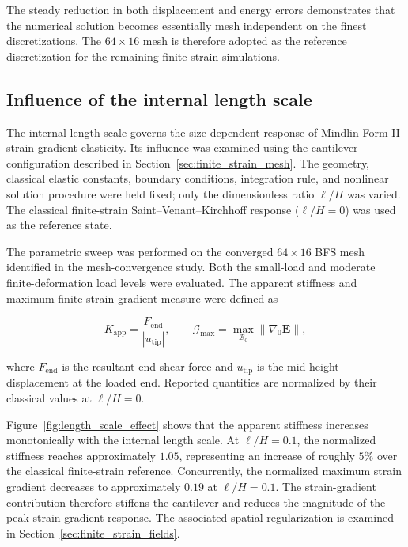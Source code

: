 \documentclass[preprint,12pt]{elsarticle}
\begin{document}
The steady reduction in both displacement and energy errors demonstrates
that the numerical solution becomes essentially mesh independent on the
finest discretizations. The $64\times16$ mesh is therefore adopted as the
reference discretization for the remaining finite-strain simulations.


\subsection{Influence of the internal length scale}

\label{sec:length_scale_effect}

The internal length scale governs the size-dependent response of Mindlin
Form-II strain-gradient elasticity. Its influence was examined using the
cantilever configuration described in Section~\ref{sec:finite_strain_mesh}. The geometry,
classical elastic constants, boundary conditions, integration rule, and
nonlinear solution procedure were held fixed; only the dimensionless ratio
$\ell/H$ was varied.  The classical finite-strain Saint--Venant--Kirchhoff
response ($\ell/H=0$) was used as the reference state. 

The parametric sweep was performed on the converged $64\times16$ BFS mesh
identified in the mesh-convergence study. Both the small-load and moderate
finite-deformation load levels were evaluated.  The apparent stiffness and
maximum finite strain-gradient measure were defined as

\begin{equation}
 K_{\mathrm{app}}=\frac{F_{\mathrm{end}}}{|u_{\mathrm{tip}}|},
 \qquad
 \mathcal{G}_{\max}=\max_{\mathcal{B}_0}\|\nabla_0\mathbf{E}\|,
 \label{eq:length_scale_measures}
\end{equation}

where $F_{\mathrm{end}}$ is the resultant end shear force and
$u_{\mathrm{tip}}$ is the mid-height displacement at the loaded end.
Reported quantities are normalized by their classical values at
$\ell/H=0$.

Figure~\ref{fig:length_scale_effect} shows that the apparent stiffness
increases monotonically with the internal length scale. At $\ell/H=0.1$,
the normalized stiffness reaches approximately $1.05$, representing an
increase of roughly $5\%$ over the classical finite-strain reference.
Concurrently, the normalized maximum strain gradient decreases to
approximately $0.19$ at $\ell/H=0.1$. The strain-gradient contribution
therefore stiffens the cantilever and reduces the magnitude of the peak
strain-gradient response. The associated spatial regularization is
examined in Section~\ref{sec:finite_strain_fields}.
\end{document}
